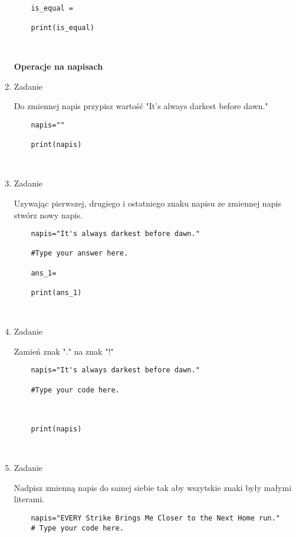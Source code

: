 \documentclass[11pt]{article}
\begin{document}
\begin{enumerate}
\begin{lstlisting}
	is_equal = 
	
	print(is_equal)
	
	
\end{lstlisting}

\medskip
\begin{Large}
	\textbf{Operacje na napisach}
\end{Large}

	\item 
\begin{Large}
	Zadanie
\end{Large}
\par
Do zmiennej napis przypisz wartość "It's always darkest before dawn."
\begin{lstlisting}
	napis=""
	
	print(napis)
	
	
\end{lstlisting}

	\item 
\begin{Large}
	Zadanie
\end{Large}
\par
Uzywając pierwszej, drugiego i ostatniego znaku napisu ze zmiennej napis stwórz nowy napis.
\begin{lstlisting}
	napis="It's always darkest before dawn."
	
	#Type your answer here.
	
	ans_1=
	
	print(ans_1)
	
	
\end{lstlisting}

	\item 
\begin{Large}
	Zadanie
\end{Large}
\par
Zamień znak "." na znak "!"
\begin{lstlisting}
	napis="It's always darkest before dawn."
	
	#Type your code here.
	
	
	
	print(napis)
	
	
\end{lstlisting}

	\item 
\begin{Large}
	Zadanie
\end{Large}
\par
Nadpisz zmienną napis do samej siebie tak aby wszytskie znaki były małymi literami.
\begin{lstlisting}
	napis="EVERY Strike Brings Me Closer to the Next Home run."
	# Type your code here.
	

\end{lstlisting}
\end{enumerate}
\end{document}

